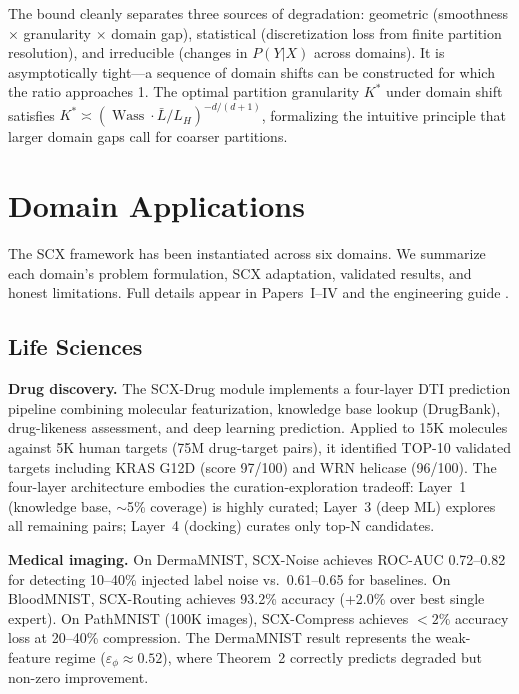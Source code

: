 \documentclass[twocolumn]{article}
\theoremstyle{definition}
\begin{document}
The bound cleanly separates three sources of degradation: geometric (smoothness $\times$ granularity $\times$ domain gap), statistical (discretization loss from finite partition resolution), and irreducible (changes in $P(Y|X)$ across domains). It is asymptotically tight---a sequence of domain shifts can be constructed for which the ratio approaches 1. The optimal partition granularity $K^*$ under domain shift satisfies $K^* \asymp (\operatorname{Wass} \cdot \bar{L} / L_H)^{-d/(d+1)}$, formalizing the intuitive principle that larger domain gaps call for coarser partitions.

\section{Domain Applications}

The SCX framework has been instantiated across six domains. We summarize each domain's problem formulation, SCX adaptation, validated results, and honest limitations. Full details appear in Papers~I--IV \cite{paperI,paperII,paperIII,paperIV} and the engineering guide \cite{engineering_guide}.

\subsection{Life Sciences}

\textbf{Drug discovery.} The SCX-Drug module implements a four-layer DTI prediction pipeline combining molecular featurization, knowledge base lookup (DrugBank), drug-likeness assessment, and deep learning prediction. Applied to 15K molecules against 5K human targets (75M drug-target pairs), it identified TOP-10 validated targets including KRAS G12D (score 97/100) and WRN helicase (96/100). The four-layer architecture embodies the curation-exploration tradeoff: Layer~1 (knowledge base, $\sim$5\% coverage) is highly curated; Layer~3 (deep ML) explores all remaining pairs; Layer~4 (docking) curates only top-N candidates.

\textbf{Medical imaging.} On DermaMNIST, SCX-Noise achieves ROC-AUC 0.72--0.82 for detecting 10--40\% injected label noise vs.\ 0.61--0.65 for baselines. On BloodMNIST, SCX-Routing achieves 93.2\% accuracy (+2.0\% over best single expert). On PathMNIST (100K images), SCX-Compress achieves $<2\%$ accuracy loss at 20--40\% compression. The DermaMNIST result represents the weak-feature regime ($\varepsilon_\phi \approx 0.52$), where Theorem~2 correctly predicts degraded but non-zero improvement.
\end{document}
